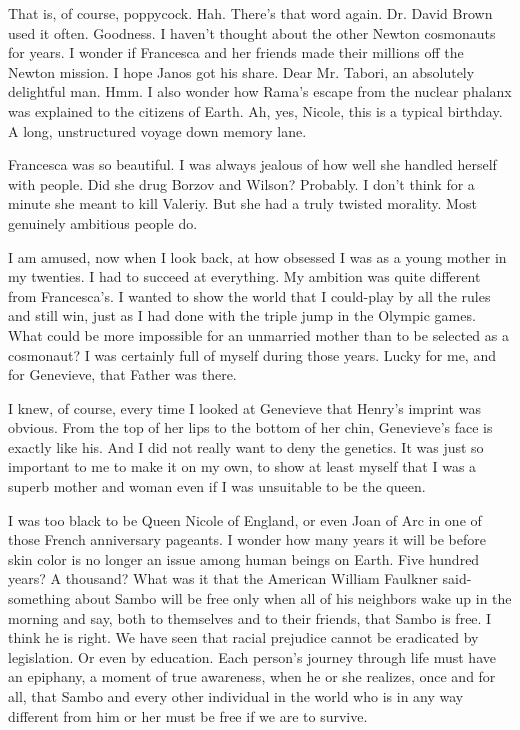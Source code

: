 \documentclass[]{article}
\begin{document}
{That is, of course, poppycock. Hah. There’s that word again. Dr. David Brown used it often. Goodness. I haven’t thought about the other Newton cosmonauts for years. I wonder if Francesca and her friends made their millions off the Newton mission. I hope Janos got his share. Dear Mr. Tabori, an absolutely delightful man. Hmm. I also wonder how Rama’s escape from the nuclear phalanx was explained to the citizens of Earth. Ah, yes, Nicole, this is a typical birthday. A long, unstructured voyage down memory lane.

Francesca was so beautiful. I was always jealous of how well she handled herself with people. Did she drug Borzov and Wilson? Probably. I don’t think for a minute she meant to kill Valeriy. But she had a truly twisted morality. Most genuinely ambitious people do.

I am amused, now when I look back, at how obsessed I was as a young mother in my twenties. I had to succeed at everything. My ambition was quite different from Francesca’s. I wanted to show the world that I could-play by all the rules and still win, just as I had done with the triple jump in the Olympic games. What could be more impossible for an unmarried mother than to be selected as a cosmonaut? I was certainly full of myself during those years. Lucky for me, and for Genevieve, that Father was there.

I knew, of course, every time I looked at Genevieve that Henry’s imprint was obvious. From the top of her lips to the bottom of her chin, Genevieve’s face is exactly like his. And I did not really want to deny the genetics. It was just so important to me to make it on my own, to show at least myself that I was a superb mother and woman even if I was unsuitable to be the queen.

I was too black to be Queen Nicole of England, or even Joan of Arc in one of those French anniversary pageants. I wonder how many years it will be before skin color is no longer an issue among human beings on Earth. Five hundred years? A thousand? What was it that the American William Faulkner said-something about Sambo will be free only when all of his neighbors wake up in the morning and say, both to themselves and to their friends, that Sambo is free. I think he is right. We have seen that racial prejudice cannot be eradicated by legislation. Or even by education. Each person’s journey through life must have an epiphany, a moment of true awareness, when he or she realizes, once and for all, that Sambo and every other individual in the world who is in any way different from him or her must be free if we are to survive.

}
\end{document}
